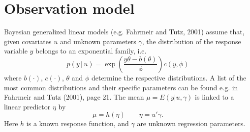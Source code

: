 \documentclass[11pt,a4paper,twoside]{bayesxarticle}
\begin{document}
\section{Observation model}

Bayesian generalized linear models (e.g. Fahrmeir and Tutz, 2001)
assume that, given covariates $u$ and unknown parameters $\gamma$,
the distribution of the response variable $y$ belongs to an
exponential family, i.e.
\begin{equation}
\label{likel} p(y \, | \, u) = \exp \left( \frac{y \theta -
b(\theta)}{\phi} \right) c(y,\phi)
\end{equation}
where $b(\cdot)$, $c(\cdot)$, $\theta$ and $\phi$ determine the
respective distributions. A list of the most common distributions
and their specific parameters can be found e.g. in Fahrmeir and
Tutz (2001), page 21. The mean $\mu=E(y|u,\gamma)$ is linked to a
linear predictor $\eta$ by
\begin{equation}
\label{glm} \mu=h(\eta) \qquad \eta= u'\gamma.
\end{equation}
Here $h$ is a known response function, and $\gamma$ are unknown
regression parameters.
\end{document}

